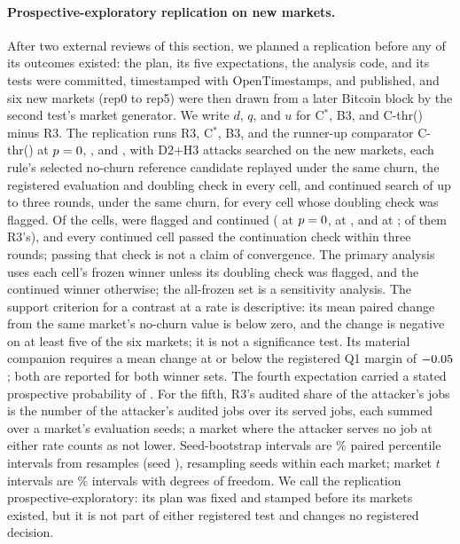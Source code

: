 \documentclass[11pt]{article}
\begin{document}
\paragraph{Prospective-exploratory replication on new markets.} After two external reviews of this section, we planned a replication before any of its outcomes existed: the plan, its five expectations, the analysis code, and its tests were committed, timestamped with OpenTimestamps, and published, and six new markets (rep0 to rep5) were then drawn from a later Bitcoin block by the second test's market generator. We write $d$, $q$, and $u$ for C$^*$, B3, and C-thr() minus R3. The replication runs R3, C$^*$, B3, and the runner-up comparator C-thr() at $p = 0$, , and , with D2+H3 attacks searched on the new markets, each rule's selected no-churn reference candidate replayed under the same churn, the registered evaluation and doubling check in every cell, and continued search of up to three rounds, under the same churn, for every cell whose doubling check was flagged. Of the  cells,  were flagged and continued ( at $p = 0$,  at , and  at ;  of them R3's), and every continued cell passed the continuation check within three rounds; passing that check is not a claim of convergence. The primary analysis uses each cell's frozen winner unless its doubling check was flagged, and the continued winner otherwise; the all-frozen set is a sensitivity analysis. The support criterion for a contrast at a rate is descriptive: its mean paired change from the same market's no-churn value is below zero, and the change is negative on at least five of the six markets; it is not a significance test. Its material companion requires a mean change at or below the registered Q1 margin of $-0.05$; both are reported for both winner sets. The fourth expectation carried a stated prospective probability of . For the fifth, R3's audited share of the attacker's jobs is the number of the attacker's audited jobs over its served jobs, each summed over a market's  evaluation seeds; a market where the attacker serves no job at either rate counts as not lower. Seed-bootstrap intervals are \% paired percentile intervals from  resamples (seed ), resampling seeds within each market; market $t$ intervals are \% intervals with  degrees of freedom. We call the replication prospective-exploratory: its plan was fixed and stamped before its markets existed, but it is not part of either registered test and changes no registered decision.
\end{document}
